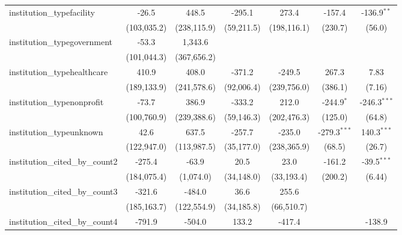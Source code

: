 \begin{tabular}{lcccccc}
   institution\_typefacility             & -26.5        & 448.5         & -295.1      & 273.4         & -157.4         & -136.9$^{**}$\\   
                                         & (103,035.2)  & (238,115.9)   & (59,211.5)  & (198,116.1)   & (230.7)        & (56.0)\\   
   institution\_typegovernment           & -53.3        & 1,343.6       &             &               &                &   \\   
                                         & (101,044.3)  & (367,656.2)   &             &               &                &   \\   
   institution\_typehealthcare           & 410.9        & 408.0         & -371.2      & -249.5        & 267.3          & 7.83\\   
                                         & (189,133.9)  & (241,578.6)   & (92,006.4)  & (239,756.0)   & (386.1)        & (7.16)\\   
   institution\_typenonprofit            & -73.7        & 386.9         & -333.2      & 212.0         & -244.9$^{*}$   & -246.3$^{***}$\\   
                                         & (100,760.9)  & (239,388.6)   & (59,146.3)  & (202,476.3)   & (125.0)        & (64.8)\\   
   institution\_typeunknown              & 42.6         & 637.5         & -257.7      & -235.0        & -279.3$^{***}$ & 140.3$^{***}$\\   
                                         & (122,947.0)  & (113,987.5)   & (35,177.0)  & (238,365.9)   & (68.5)         & (26.7)\\   
   institution\_cited\_by\_count2        & -275.4       & -63.9         & 20.5        & 23.0          & -161.2         & -39.5$^{***}$\\   
                                         & (184,075.4)  & (1,074.0)     & (34,148.0)  & (33,193.4)    & (200.2)        & (6.44)\\   
   institution\_cited\_by\_count3        & -321.6       & -484.0        & 36.6        & 255.6         &                &   \\   
                                         & (185,163.7)  & (122,554.9)   & (34,185.8)  & (66,510.7)    &                &   \\   
   institution\_cited\_by\_count4        & -791.9       & -504.0        & 133.2       & -417.4        &                & -138.9\\   

\end{tabular}
